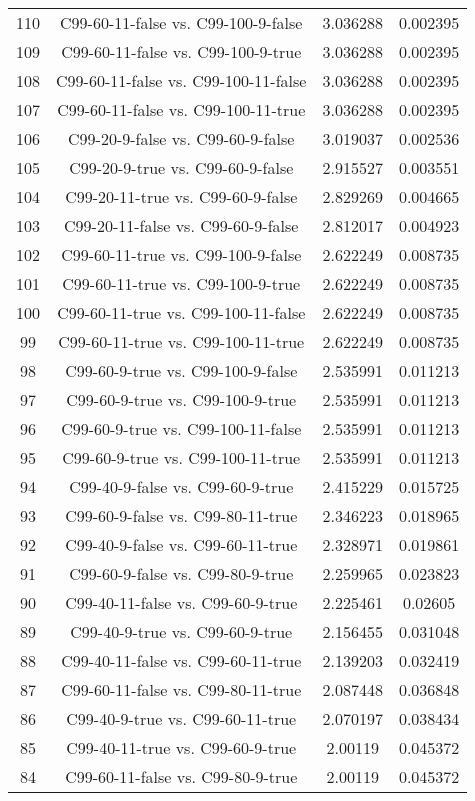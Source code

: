 \documentclass[a4paper,10pt]{article}
\begin{document}
\begin{landscape}
\begin{table}[!htp]
\begin{tabular}{cccc}
110&C99-60-11-false vs. C99-100-9-false&3.036288&0.002395\\
109&C99-60-11-false vs. C99-100-9-true&3.036288&0.002395\\
108&C99-60-11-false vs. C99-100-11-false&3.036288&0.002395\\
107&C99-60-11-false vs. C99-100-11-true&3.036288&0.002395\\
106&C99-20-9-false vs. C99-60-9-false&3.019037&0.002536\\
105&C99-20-9-true vs. C99-60-9-false&2.915527&0.003551\\
104&C99-20-11-true vs. C99-60-9-false&2.829269&0.004665\\
103&C99-20-11-false vs. C99-60-9-false&2.812017&0.004923\\
102&C99-60-11-true vs. C99-100-9-false&2.622249&0.008735\\
101&C99-60-11-true vs. C99-100-9-true&2.622249&0.008735\\
100&C99-60-11-true vs. C99-100-11-false&2.622249&0.008735\\
99&C99-60-11-true vs. C99-100-11-true&2.622249&0.008735\\
98&C99-60-9-true vs. C99-100-9-false&2.535991&0.011213\\
97&C99-60-9-true vs. C99-100-9-true&2.535991&0.011213\\
96&C99-60-9-true vs. C99-100-11-false&2.535991&0.011213\\
95&C99-60-9-true vs. C99-100-11-true&2.535991&0.011213\\
94&C99-40-9-false vs. C99-60-9-true&2.415229&0.015725\\
93&C99-60-9-false vs. C99-80-11-true&2.346223&0.018965\\
92&C99-40-9-false vs. C99-60-11-true&2.328971&0.019861\\
91&C99-60-9-false vs. C99-80-9-true&2.259965&0.023823\\
90&C99-40-11-false vs. C99-60-9-true&2.225461&0.02605\\
89&C99-40-9-true vs. C99-60-9-true&2.156455&0.031048\\
88&C99-40-11-false vs. C99-60-11-true&2.139203&0.032419\\
87&C99-60-11-false vs. C99-80-11-true&2.087448&0.036848\\
86&C99-40-9-true vs. C99-60-11-true&2.070197&0.038434\\
85&C99-40-11-true vs. C99-60-9-true&2.00119&0.045372\\
84&C99-60-11-false vs. C99-80-9-true&2.00119&0.045372\\

\end{tabular}
\end{table}
\end{landscape}
\end{document}
